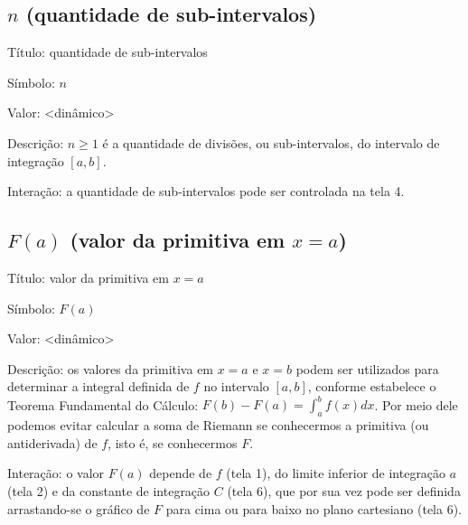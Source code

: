 \documentclass[a4paper,10pt]{scrartcl}
\begin{document}
  \subsection*{$n$ (quantidade de sub-intervalos)}
    \begin{compactdesc}
	\item{Título:} quantidade de sub-intervalos
	\item{Símbolo:} $n$
	\item{Valor:} <dinâmico>
	\item{Descrição:} $n \ge 1$ é a quantidade de divisões, ou sub-intervalos, do intervalo de integração $[a,b]$.
	\item{Interação:} a quantidade de sub-intervalos pode ser controlada na tela 4.
    \end{compactdesc}
	
  \subsection*{$F(a)$ (valor da primitiva em $x=a$)}
    \begin{compactdesc}
	\item{Título:} valor da primitiva em $x = a$
	\item{Símbolo:} $F(a)$
	\item{Valor:} <dinâmico>
	\item{Descrição:} os valores da primitiva em $x = a$ e $x = b$ podem ser utilizados para determinar a integral definida de $f$ no intervalo $[a,b]$, conforme estabelece o Teorema Fundamental do Cálculo: $F(b)-F(a) = \int_a^b f(x) dx$. Por meio dele podemos evitar calcular a soma de Riemann se conhecermos a primitiva (ou antiderivada) de $f$, isto é, se conhecermos $F$.
	\item{Interação:} o valor $F(a)$ depende de $f$ (tela 1), do limite inferior de integração $a$ (tela 2) e da constante de integração $C$ (tela 6), que por sua vez pode ser definida arrastando-se o gráfico de $F$ para cima ou para baixo no plano cartesiano (tela 6).
    \end{compactdesc}
	
  
  
\end{document}
